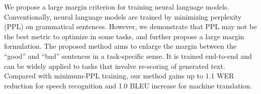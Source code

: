 We propose a large margin criterion for training neural language models. Conventionally, neural language models are trained by minimizing perplexity (PPL) on grammatical sentences. However, we demonstrate that PPL may not be the best metric to optimize in some tasks, and further propose a large margin formulation. The proposed method aims to enlarge the margin between the ``good'' and ``bad'' sentences in a task-specific sense. It is trained end-to-end and can be widely applied to tasks that involve re-scoring of generated text. Compared with minimum-PPL training, our method gains up to 1.1 WER reduction for speech recognition and 1.0 BLEU increase for machine translation.
